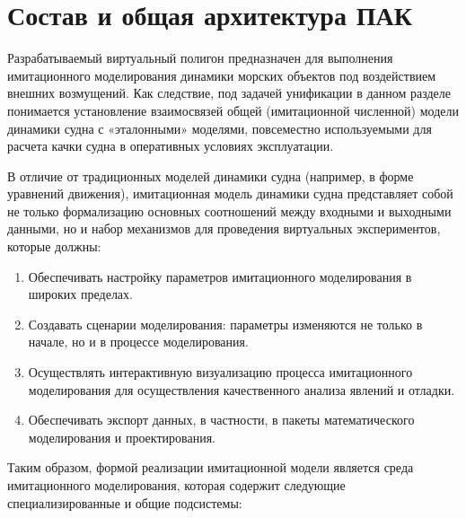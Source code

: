 \section{Состав и общая архитектура ПАК}

Разрабатываемый виртуальный полигон предназначен для выполнения имитационного моделирования динамики морских объектов под воздействием внешних возмущений. Как следствие, под задачей унификации в данном разделе понимается установление взаимосвязей общей (имитационной численной) модели динамики судна с «эталонными» моделями, повсеместно используемыми для расчета качки судна в оперативных условиях эксплуатации.

В отличие от традиционных моделей динамики судна (например, в форме уравнений движения), имитационная модель динамики судна представляет собой не только формализацию основных соотношений между входными и выходными данными, но и набор механизмов для проведения виртуальных экспериментов, которые должны:

\begin{enumerate}
\item	Обеспечивать настройку параметров имитационного моделирования в широких пределах.
\item	Создавать сценарии моделирования: параметры изменяются не только в начале, но и в процессе моделирования.
\item	Осуществлять интерактивную визуализацию процесса имитационного моделирования для осуществления качественного анализа явлений и отладки.
\item	Обеспечивать экспорт данных, в частности, в пакеты математического моделирования и проектирования.
\end{enumerate}

Таким образом, формой реализации имитационной модели является среда имитационного моделирования, которая содержит следующие специализированные и общие подсистемы:

